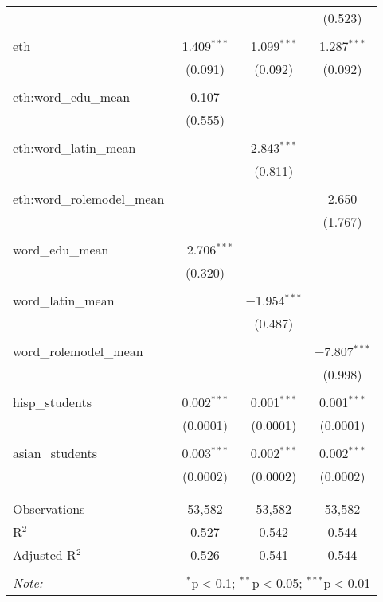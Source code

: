 \begin{table}[!htbp]
\begin{tabular}{@{\extracolsep{-2pt}}lccc}
  &  &  & (0.523) \\ 
  & & & \\ 
 eth & 1.409$^{***}$ & 1.099$^{***}$ & 1.287$^{***}$ \\ 
  & (0.091) & (0.092) & (0.092) \\ 
  & & & \\ 
 eth:word\_edu\_mean & 0.107 &  &  \\ 
  & (0.555) &  &  \\ 
  & & & \\ 
 eth:word\_latin\_mean &  & 2.843$^{***}$ &  \\ 
  &  & (0.811) &  \\ 
  & & & \\ 
 eth:word\_rolemodel\_mean &  &  & 2.650 \\ 
  &  &  & (1.767) \\ 
  & & & \\ 
 word\_edu\_mean & $-$2.706$^{***}$ &  &  \\ 
  & (0.320) &  &  \\ 
  & & & \\ 
 word\_latin\_mean &  & $-$1.954$^{***}$ &  \\ 
  &  & (0.487) &  \\ 
  & & & \\ 
 word\_rolemodel\_mean &  &  & $-$7.807$^{***}$ \\ 
  &  &  & (0.998) \\ 
  & & & \\ 
 hisp\_students & 0.002$^{***}$ & 0.001$^{***}$ & 0.001$^{***}$ \\ 
  & (0.0001) & (0.0001) & (0.0001) \\ 
  & & & \\ 
 asian\_students & 0.003$^{***}$ & 0.002$^{***}$ & 0.002$^{***}$ \\ 
  & (0.0002) & (0.0002) & (0.0002) \\ 
  & & & \\ 
\hline \\[-1.8ex] 
Observations & 53,582 & 53,582 & 53,582 \\ 
R$^{2}$ & 0.527 & 0.542 & 0.544 \\ 
Adjusted R$^{2}$ & 0.526 & 0.541 & 0.544 \\ 
\hline 
\hline \\[-1.8ex] 
\textit{Note:}  & \multicolumn{3}{r}{$^{*}$p$<$0.1; $^{**}$p$<$0.05; $^{***}$p$<$0.01} \\ 
\end{tabular} 
\end{table} 
